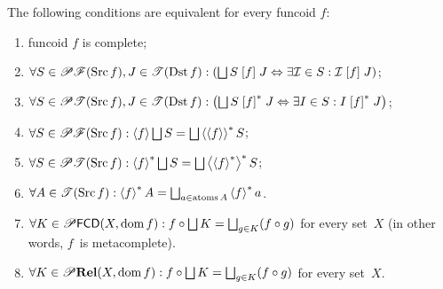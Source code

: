 \begin{thm}
The following conditions are equivalent for every funcoid $f$:
\begin{enumerate}
\item \label{cfcd:main}funcoid $f$ is complete;
\item \label{cfcd:r-filt}$\forall S\in\subsets\mathscr{F}(\Src
f),J\in\mathscr{T}(\Dst f):\left(\bigsqcup S\suprel
fJ\Leftrightarrow\exists\mathcal{I}\in S:\mathcal{I}\suprel fJ\right)$;
\item \label{cfcd:r-set}$\forall S\in\subsets\mathscr{T}(\Src f),J\in\mathscr{T}(\Dst
f):\left(\bigsqcup S\rsuprel fJ\Leftrightarrow\exists I\in S:I\rsuprel
fJ\right)$;
\item \label{cfcd:f-filt}$\forall S\in\subsets\mathscr{F}(\Src f):\supfun
f\bigsqcup S=\bigsqcup\rsupfun{\supfun f}S$;
\item \label{cfcd:f-set}$\forall S\in\subsets\mathscr{T}(\Src f):\rsupfun
f\bigsqcup S=\bigsqcup\rsupfun{\rsupfun f}S$;
\item \label{cfcd:sing}$\forall A\in\mathscr{T}(\Src f):\rsupfun
fA=\bigsqcup_{a\in\atoms A}\rsupfun fa$.
\item \label{cfcd:comb-filt}$\forall K\in\subsets\mathsf{FCD}(X,\dom f): f\circ\bigsqcup K=\bigsqcup_{g\in K}(f\circ g)$ for every set~$X$ (in other words, $f$~is metacomplete).
\item \label{cfcd:comb-rel}$\forall K\in\subsets\mathbf{Rel}(X,\dom f): f\circ\bigsqcup K=\bigsqcup_{g\in K}(f\circ g)$ for every set~$X$.
\end{enumerate}
\end{thm}
